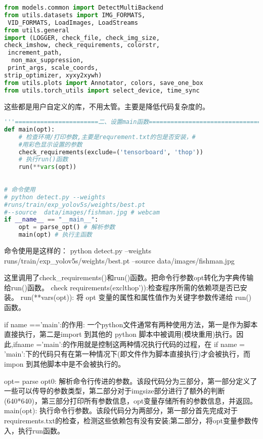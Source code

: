 \begin{lstlisting}[language=python]
from models.common import DetectMultiBackend
from utils.datasets import IMG_FORMATS,
 VID_FORMATS, LoadImages, LoadStreams
from utils.general 
import (LOGGER, check_file, check_img_size, 
check_imshow, check_requirements, colorstr,
 increment_path, 
  non_max_suppression,
 print_args, scale_coords, 
strip_optimizer, xyxy2xywh)
from utils.plots import Annotator, colors, save_one_box
from utils.torch_utils import select_device, time_sync
\end{lstlisting}
这些都是用户自定义的库，不用太管。主要是降低代码复杂度的。
\begin{lstlisting}[language=python]
'''=======================二、设置main函数==================================='''
def main(opt):
    # 检查环境/打印参数,主要是requrement.txt的包是否安装，#
    #用彩色显示设置的参数
    check_requirements(exclude=('tensorboard', 'thop'))
    # 执行run()函数
    run(**vars(opt))
 
 
# 命令使用
# python detect.py --weights 
#runs/train/exp_yolov5s/weights/best.pt 
#--source  data/images/fishman.jpg # webcam
if __name__ == "__main__":
    opt = parse_opt() # 解析参数
    main(opt) # 执行主函数
\end{lstlisting}
 
命令使用是这样的：
python detect.py --weights runs/train/exp_yolov5s/weights/best.pt --source  data/images/fishman.jpg 

这里调用了check_requirements()和run()函数。把命令行参数opt转化为字典传输给run()函数。
check requirements(exclthop')):检查程序所需的依赖项是否已安装。
run(**vars(opt)): 将 opt 变量的属性和属性值作为关键字参数传递给 run() 函数。

if name =='main’:的作用:
一个python文件通常有两种使用方法，第一是作为脚本直接执行，第二是import 到其他的 python 脚本中被调用(模块重用)执行。因此,ifname ='main’:的作用就是控制这两种情况执行代码的过程，在 if name = 'main':下的代码只有在第一种情况下(即文件作为脚本直接执行)才会被执行，而impon 到其他脚本中是不会被执行的。

opt= parse opt0: 解析命令行传进的参数。该段代码分为三部分，第一部分定义了一些可以传导的参数类型，第二部分对于imgsize部分进行了额外的判断(640*640)，第三部分打印所有参数信息，opt变量存储所有的参数信息，并返回。main(opt): 执行命令行参数。该段代码分为两部分，第一部分首先完成对于requirements.txt的检查，检测这些依赖包有没有安装;第二部分，将opt变量参数传入，执行run函数。

